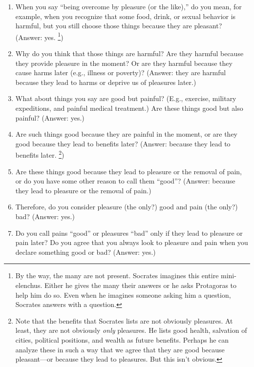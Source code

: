 \documentclass[12pt,letterpaper]{article}
\begin{document}
\begin{enumerate}
    \item When you say ``being overcome by pleasure (or the like),'' do you mean, for example, when you recognize that some food, drink, or sexual behavior is harmful, but you still choose those things because they are pleasant?
        (Answer: yes.%
        \footnote{By the way, the many are not present.
        Socrates imagines this entire mini-elenchus.
        Either he gives the many their answers or he asks Protagoras to help him do so.
        Even when he imagines someone asking him a question, Socrates answers with a question.})
    \item Why do you think that those things are harmful?
        Are they harmful because they provide pleasure in the moment?
        Or are they harmful because they cause harms later (e.g., illness or poverty)?
        (Answer: they are harmful because they lead to harms or deprive us of pleasures later.)
    \item What about things you say are good but painful?
        (E.g., exercise, military expeditions, and painful medical treatment.)
        Are these things good but also painful?
        (Answer: yes.)
    \item Are such things good because they are painful in the moment, or are they good because they lead to benefits later?
        (Answer: because they lead to benefits later.%
        \footnote{Note that the benefits that Socrates lists are not obviously pleasures.
        At least, they are not obviously \textit{only} pleasures.
        He lists good health, salvation of cities, political positions, and wealth as future benefits.
        Perhaps he can analyze these in such a way that we agree that they are good because pleasant---or because they lead to pleasures.
        But this isn't obvious.})
    \item Are these things good because they lead to pleasure or the removal of pain, or do you have some other reason to call them ``good''?
        (Answer: because they lead to pleasure or the removal of pain.)
    \item Therefore, do you consider pleasure (the only?) good and pain (the only?) bad?
        (Answer: yes.)
    \item Do you call pains ``good'' or pleasures ``bad'' only if they lead to pleasure or pain later?
        Do you agree that you always look to pleasure and pain when you declare something good or bad?
        (Answer: yes.)
\end{enumerate}
\end{document}
